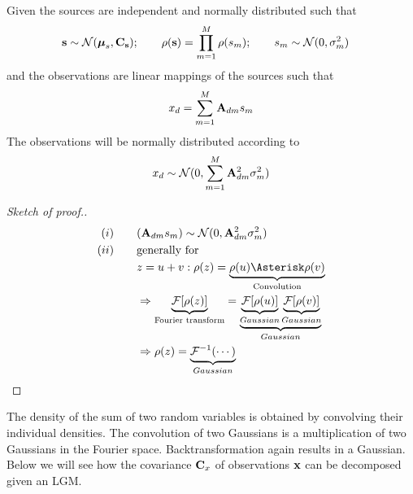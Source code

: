 \begin{proposition}
Given the sources are independent and normally distributed such that
\begin{align*}
	\mathbf{s} \sim \mathcal{N}(\mathbf{\boldsymbol \mu}_s,\mathbf{C_s}); \qquad
	\rho(\mathbf{s}) = \prod_{m=1}^M \rho(s_m); \qquad
	s_m \sim \mathcal{N}(0,\sigma_m^2) &
\end{align*}
and the observations are linear mappings of the sources such that
\begin{align*}
	x_d = \sum_{m=1}^M \mathbf{A}_{dm} s_m
\end{align*}
The observations will be normally distributed according to
\begin{align*}
	x_d \sim \mathcal{N}(0, \sum_{m=1}^M \mathbf{A}_{dm}^2 \sigma_m^2)
\end{align*}
\end{proposition}

\begin{proof}[Sketch of proof.]
	\begin{align*}
	(i) &\qquad (\mb{A}_{dm} s_m) \sim \mathcal{N}(0,\mb{A}_{dm}^2 \sigma_m^2) \\
	(ii) &\qquad \text{generally for } \\
		 &\qquad z = u + v : \rho(z) = \underbrace{\rho(u) \Asterisk \rho(v)}_{\text{Convolution}}\\
	     &\qquad \Rightarrow \underbrace{\mathcal{F}[\rho(z)]}_{\text{Fourier transform}} 
	       = \underbrace{\underbrace{\mathcal{F}[\rho(u)]}_{Gaussian} \underbrace{\mathcal{F}[\rho(v)]}_{Gaussian} }_{Gaussian} \\
	     &\qquad \Rightarrow \rho(z) = \underbrace{\mathcal{F}^{-1}(\cdots)}_{Gaussian}
\end{align*}
\end{proof}
\noindent 
The density of the sum of two random variables is obtained by convolving their individual densities. 
The convolution of two Gaussians is a multiplication of two Gaussians in the Fourier space. Backtransformation again results
in a Gaussian. Below we will see how the covariance $\mathbf{C}_x$ of observations $\mathbf{x}$ can be decomposed given an LGM.


